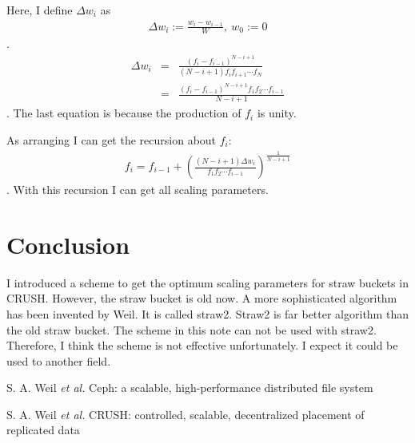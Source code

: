 \documentclass[a4paper,11pt]{article}
\begin{document}
Here, I define $\Delta w_i$ as 
\begin{eqnarray}
\Delta w_i := \frac{w_i - w_{i-1}}{W},\ w_0 := 0
\end{eqnarray}
.
\begin{eqnarray}
\Delta w_i
    &=& \frac{(f_i - f_{i-1})^{N-i+1}}{(N-i+1)f_i f_{i+1} \cdots f_N} \\
    &=& \frac{(f_i - f_{i-1})^{N-i+1} f_1 f_2 \cdots f_{i-1}}{N-i+1}
\end{eqnarray}
. The last equation is because the production of $f_i$ is unity.

As arranging I can get the recursion about $f_i$:
\begin{eqnarray}
f_i = f_{i-1} + \left(
    \frac{(N-i+1)\Delta w_i}{f_1 f_2 \cdots f_{i-1}}
\right)^\frac{1}{N-i+1}
\end{eqnarray}
. With this recursion I can get all scaling parameters.

\section{Conclusion}

I introduced a scheme to get the optimum scaling parameters for straw buckets in CRUSH. However, the straw bucket is old now.
A more sophisticated algorithm has been invented by Weil.
It is called straw2.
Straw2 is far better algorithm than the old straw bucket.
The scheme in this note can not be used with straw2.
Therefore, I think the scheme is not effective unfortunately.
I expect it could be used to another field.

\begin{thebibliography}{9}

 S. A. Weil {\it et al.}
Ceph: a scalable, high-performance distributed file system

 S. A. Weil {\it et al.}
CRUSH: controlled, scalable, decentralized placement of replicated data

\end{thebibliography}
\end{document}
